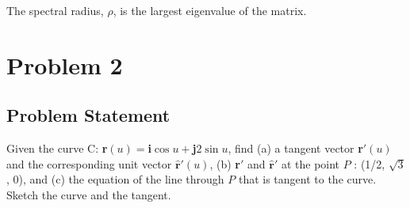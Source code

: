 \documentclass{article}
\begin{document}
    The spectral radius, $\rho$, is the largest eigenvalue of the matrix.
    
    \begin{centering}
    
    
    \end{centering}
    
    \pagebreak
     
    
    \section*{Problem 2}
    \subsection*{Problem Statement}
    
    Given the curve C: {\bf r}$(u) = ${\bf i}$ \cos u + ${\bf j}$ 2 \sin u$, find (a) a tangent vector {\bf r}$' (u)$ and the corresponding unit vector $\mathbf{\hat{r}'}(u)$, (b) {\bf r}$'$ and $\mathbf{\hat{r}'}$ at the point $P$ : (1/2, $\sqrt{3}$, 0), and (c) the equation of the line through $P$ that is tangent to the curve. Sketch the curve and the tangent.
    
    
\end{document}
